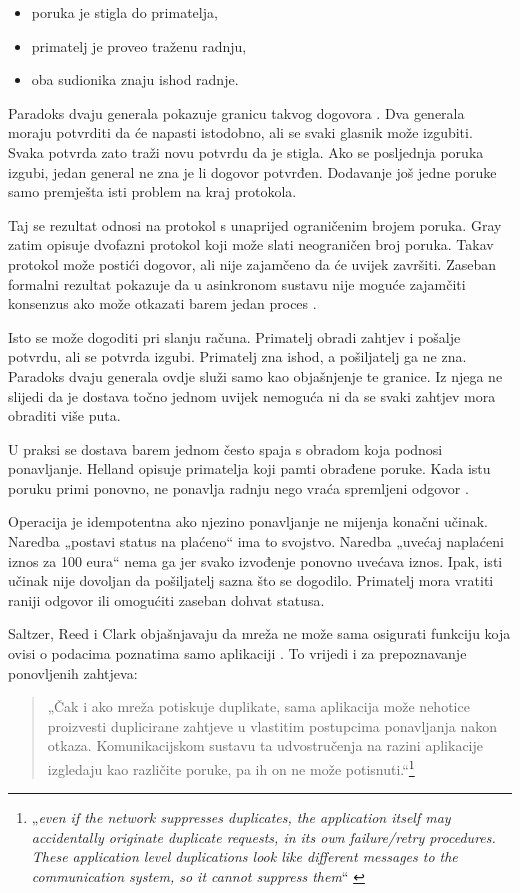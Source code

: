 \begin{itemize}[nosep, leftmargin=1.4cm]
  \item poruka je stigla do primatelja,
  \item primatelj je proveo traženu radnju,
  \item oba sudionika znaju ishod radnje.
\end{itemize}

Paradoks dvaju generala pokazuje granicu takvog dogovora
\cite{gray1978notes}. Dva generala moraju potvrditi da će napasti istodobno,
ali se svaki glasnik može izgubiti. Svaka potvrda zato traži novu potvrdu da
je stigla. Ako se posljednja poruka izgubi, jedan general ne zna je li dogovor
potvrđen. Dodavanje još jedne poruke samo premješta isti problem na kraj
protokola.

Taj se rezultat odnosi na protokol s unaprijed ograničenim brojem poruka.
Gray zatim opisuje dvofazni protokol koji može slati neograničen broj poruka.
Takav protokol može postići dogovor, ali nije zajamčeno da će uvijek završiti.
Zaseban formalni rezultat pokazuje da u asinkronom sustavu nije moguće
zajamčiti konsenzus ako može otkazati barem jedan proces
\cite{fischer1985impossibility}.

Isto se može dogoditi pri slanju računa. Primatelj obradi zahtjev i pošalje
potvrdu, ali se potvrda izgubi. Primatelj zna ishod, a pošiljatelj ga ne zna.
Paradoks dvaju generala ovdje služi samo kao objašnjenje te granice. Iz njega
ne slijedi da je dostava točno jednom uvijek nemoguća ni da se svaki zahtjev
mora obraditi više puta.

U praksi se dostava barem jednom često spaja s obradom koja podnosi
ponavljanje. Helland opisuje primatelja koji pamti obrađene poruke. Kada istu
poruku primi ponovno, ne ponavlja radnju nego vraća spremljeni odgovor
\cite{helland2007lifebeyond}.

Operacija je idempotentna ako njezino ponavljanje ne mijenja konačni učinak.
Naredba „postavi status na plaćeno“ ima to svojstvo. Naredba „uvećaj naplaćeni
iznos za 100 eura“ nema ga jer svako izvođenje ponovno uvećava iznos. Ipak,
isti učinak nije dovoljan da pošiljatelj sazna što se dogodilo. Primatelj mora
vratiti raniji odgovor ili omogućiti zaseban dohvat statusa.

Saltzer, Reed i Clark objašnjavaju da mreža ne može sama osigurati funkciju
koja ovisi o podacima poznatima samo aplikaciji \cite{saltzer1984endtoend}.
To vrijedi i za prepoznavanje ponovljenih zahtjeva:

\begin{quote}
„Čak i ako mreža potiskuje duplikate, sama aplikacija može nehotice
proizvesti duplicirane zahtjeve u vlastitim postupcima ponavljanja nakon
otkaza. Komunikacijskom sustavu ta udvostručenja na razini aplikacije
izgledaju kao različite poruke, pa ih on ne može
potisnuti.“\footnote{„\emph{even if the network suppresses duplicates, the
application itself may accidentally originate duplicate requests, in its
own failure/retry procedures. These application level duplications look
like different messages to the communication system, so it cannot suppress
them}“ \cite{saltzer1984endtoend}} \end{quote}

